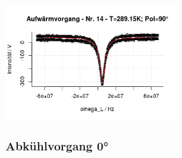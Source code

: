 \documentclass[12pt]{article}
\begin{document}
\begin{minipage}[h!]{\textwidth}
{		\includegraphics[width=0.49\textwidth]{figures/warm90-14.png}\vskip -10pt}
\end{minipage}

\subsubsection{Abkühlvorgang 0°}
\end{document}
